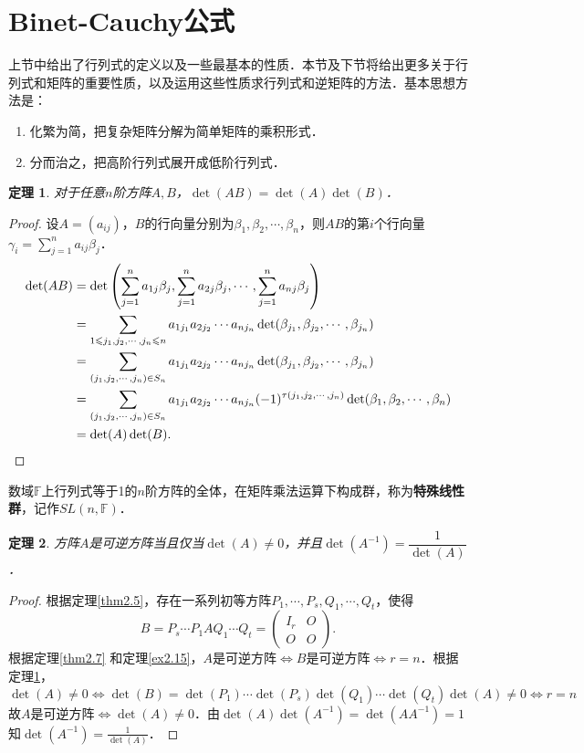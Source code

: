 \documentclass[a4paper,fontset=windows]{ctexbook}
\newtheorem{theorem}{定理}[chapter]
\theoremstyle{definition}
\renewcommand{\le}{\leqslant}
\begin{document}
\clearpage\section{ Binet-Cauchy公式}

上节中给出了行列式的定义以及一些最基本的性质．本节及下节将给出更多关于行列式和矩阵的重要性质，以及运用这些性质求行列式和逆矩阵的方法．基本思想方法是：
\begin{enumerate}
\item 化繁为简，把复杂矩阵分解为简单矩阵的乘积形式．
\item 分而治之，把高阶行列式展开成低阶行列式．
\end{enumerate}

\begin{theorem}\label{thm3.4}
对于任意$n$阶方阵$A,B$，$\det(AB)=\det(A)\det(B)$．
\end{theorem}

\begin{proof}
设$A=(a_{ij})$，$B$的行向量分别为$\beta_1,\beta_2,\cdots,\beta_n$，则$AB$的第$i$个行向量$\gamma_i=\sum\limits_{j=1}^na_{ij}\beta_j$．
\begin{align*}
\det(AB)&=\det\left(\sum_{j=1}^na_{1j}\beta_j,\sum_{j=1}^na_{2j}\beta_j,\cdots,\sum_{j=1}^na_{nj}\beta_j\right) \\
&=\sum_{1\le j_1,j_2,\cdots,j_n\le n}a_{1j_1}a_{2j_2}\cdots a_{nj_n}\det(\beta_{j_1},\beta_{j_2},\cdots,\beta_{j_n}) \\
&=\sum_{(j_1,j_2,\cdots,j_n)\in S_n}a_{1j_1}a_{2j_2}\cdots a_{nj_n}\det(\beta_{j_1},\beta_{j_2},\cdots,\beta_{j_n}) \\
&=\sum_{(j_1,j_2,\cdots,j_n)\in S_n}a_{1j_1}a_{2j_2}\cdots a_{nj_n}(-1)^{\tau(j_1,j_2,\cdots,j_n)}\det(\beta_1,\beta_2,\cdots,\beta_n) \\
&=\det(A)\det(B). \qedhere
\end{align*}
\end{proof}

\medskip 数域$\mathbb{F}$上行列式等于1的$n$阶方阵的全体，在矩阵乘法运算下构成群，称为{\bf 特殊线性群}，记作$SL(n,\mathbb{F})$．

\begin{theorem}\label{thm3.5}
方阵$A$是可逆方阵当且仅当$\det(A)\ne 0$，并且$\det(A^{-1})=\dfrac{1}{\det(A)}$．
\end{theorem}

\begin{proof}
根据定理\ref{thm2.5}，存在一系列初等方阵$P_1,\cdots,P_s,Q_1,\cdots,Q_t$，使得
$$B=P_s\cdots P_1AQ_1\cdots Q_t=\begin{pmatrix}I_r&O \\ O&O\end{pmatrix}.$$
根据定理\ref{thm2.7} 和定理\ref{ex2.15}，$A$是可逆方阵$\Leftrightarrow B$是可逆方阵$\Leftrightarrow r=n$．根据定理\ref{thm3.4}，
$$\det(A)\ne 0\Leftrightarrow\det(B)=\det(P_1)\cdots\det(P_s)\det(Q_1)\cdots\det(Q_t)\det(A)\ne 0\Leftrightarrow r=n$$
故$A$是可逆方阵$\Leftrightarrow\det(A)\ne 0$．由$\det(A)\det(A^{-1})=\det(AA^{-1})=1$知$\det(A^{-1})=\frac{1}{\det(A)}$．
\end{proof}
\end{document}
